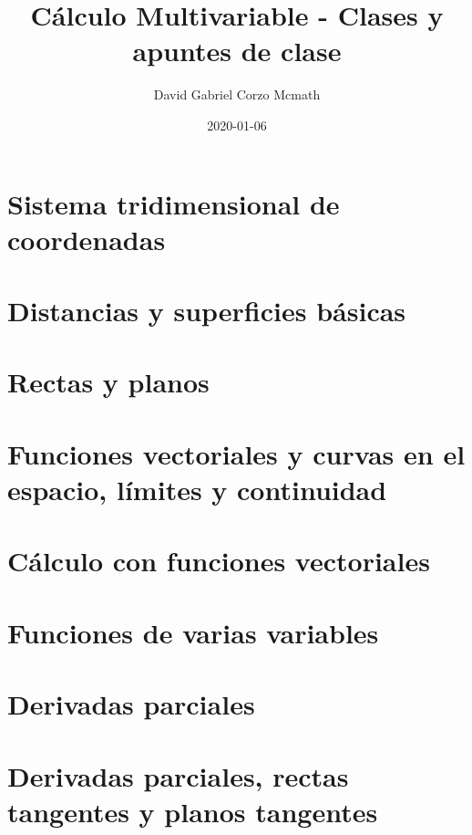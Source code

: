 \documentclass[openany]{book}
\title{Cálculo Multivariable - Clases y apuntes de clase}
\date{2020-01-06}
\author{David Gabriel Corzo Mcmath}
\begin{document}
\maketitle
\tableofcontents
\tikzblockdefinitions

\chapter{Sistema tridimensional de coordenadas}


\chapter{Distancias y superficies básicas} %


\chapter{Rectas y planos} %


\chapter{Funciones vectoriales y curvas en el espacio, límites y continuidad} %


\chapter{Cálculo con funciones vectoriales}

\chapter{Funciones de varias variables} %


\chapter{Derivadas parciales} %


\chapter{Derivadas parciales, rectas tangentes y planos tangentes} %

\end{document}
